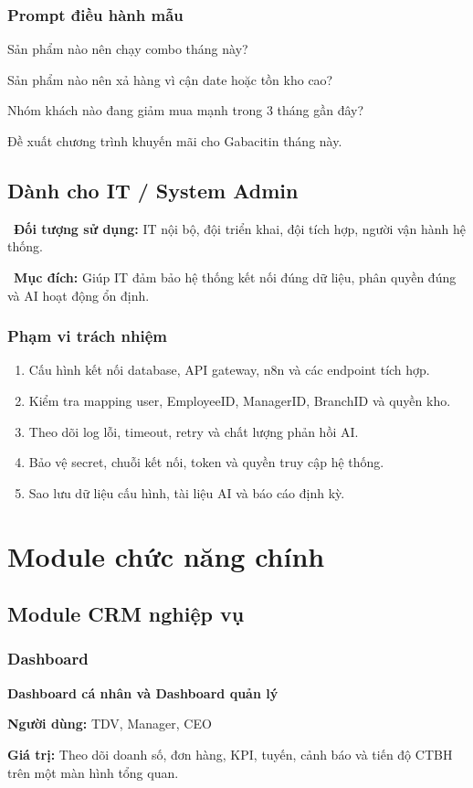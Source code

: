 \documentclass[12pt,a4paper,oneside,openany]{book}
\newcommand{\screenpurpose}[1]{\begin{tcolorbox}[colback=medgreen!8,colframe=medgreen!55,left=6pt,right=6pt,top=4pt,bottom=4pt]\faFlag\ \textbf{Mục đích:} #1\end{tcolorbox}}
\newcommand{\screenuser}[1]{\noindent\faUsers\ \textbf{Đối tượng sử dụng:} #1\par\smallskip}
\newcommand{\prompt}[1]{\begin{tcolorbox}[codeBox]#1\end{tcolorbox}}
\newcommand{\modulecard}[3]{\begin{tcolorbox}[roleBox]\textbf{#1}\par\smallskip\textbf{Người dùng:} #2\par\textbf{Giá trị:} #3\end{tcolorbox}}
\begin{document}
\section{Prompt điều hành mẫu}
\prompt{Sản phẩm nào nên chạy combo tháng này?}
\prompt{Sản phẩm nào nên xả hàng vì cận date hoặc tồn kho cao?}
\prompt{Nhóm khách nào đang giảm mua mạnh trong 3 tháng gần đây?}
\prompt{Đề xuất chương trình khuyến mãi cho Gabacitin tháng này.}

\chapter{Dành cho IT / System Admin}
\screenuser{IT nội bộ, đội triển khai, đội tích hợp, người vận hành hệ thống.}
\screenpurpose{Giúp IT đảm bảo hệ thống kết nối đúng dữ liệu, phân quyền đúng và AI hoạt động ổn định.}

\section{Phạm vi trách nhiệm}
\begin{enumerate}
  \item Cấu hình kết nối database, API gateway, n8n và các endpoint tích hợp.
  \item Kiểm tra mapping user, EmployeeID, ManagerID, BranchID và quyền kho.
  \item Theo dõi log lỗi, timeout, retry và chất lượng phản hồi AI.
  \item Bảo vệ secret, chuỗi kết nối, token và quyền truy cập hệ thống.
  \item Sao lưu dữ liệu cấu hình, tài liệu AI và báo cáo định kỳ.
\end{enumerate}

\part{Module chức năng chính}

\chapter{Module CRM nghiệp vụ}

\section{Dashboard}
\modulecard{Dashboard cá nhân và Dashboard quản lý}{TDV, Manager, CEO}{Theo dõi doanh số, đơn hàng, KPI, tuyến, cảnh báo và tiến độ CTBH trên một màn hình tổng quan.}
\end{document}
